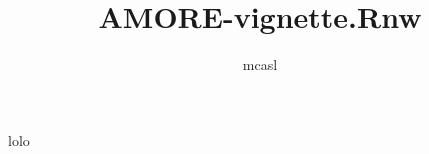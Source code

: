 \documentclass[a4paper]{article}
\begin{document}
\title{AMORE-vignette.Rnw}
\author{mcasl}

\maketitle
lolo
\end{document}
